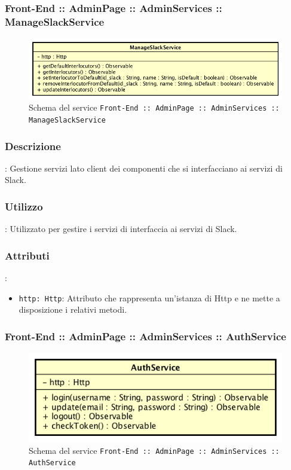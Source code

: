 \documentclass[../ManualeSviluppatore_v2.0.0.tex]{subfiles}
\begin{document}
     	 		\subsubsection{Front-End :: AdminPage :: AdminServices :: ManageSlackService}
				\begin{figure}[!h]
					\centering
					\includegraphics[scale=0.6]{Architettura/Front-End/AdminPage/AdminServices/ManageSlackService.png}
					\caption{Schema del service \texttt{Front-End :: AdminPage :: AdminServices :: ManageSlackService}}
				\end{figure}

				\subsubsection{Descrizione}: Gestione servizi lato client dei componenti che si interfacciano ai servizi di Slack.
				\subsubsection{Utilizzo}: Utilizzato per gestire i servizi di interfaccia ai servizi di Slack.
				\subsubsection{Attributi}:
				\begin{itemize}
					\item \texttt{http: Http}: Attributo che rappresenta un'istanza di Http e ne mette a disposizione i relativi metodi.
				\end{itemize}
\newpage
		      	\subsubsection{Front-End :: AdminPage :: AdminServices :: AuthService}
				\begin{figure}[!h]
					\centering
					\includegraphics[scale=0.6]{Architettura/Front-End/AdminPage/AdminServices/AuthService.png}
					\caption{Schema del service \texttt{Front-End :: AdminPage :: AdminServices :: AuthService}}
				\end{figure}
\end{document}
